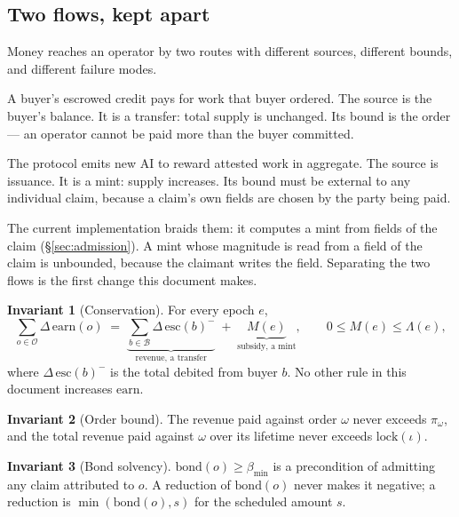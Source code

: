 \documentclass[11pt,a4paper]{article}
\theoremstyle{definition}
\newtheorem{invariant}{Invariant}[section]
\theoremstyle{remark}
\newcommand{\Ord}{\omega}
\newcommand{\Ops}{\mathcal{O}}
\newcommand{\Buyers}{\mathcal{B}}
\begin{document}
\subsection{Two flows, kept apart}

Money reaches an operator by two routes with different sources, different
bounds, and different failure modes.

\begin{description}[leftmargin=1.6em,style=nextline]
\item[Revenue.] A buyer's escrowed credit pays for work that buyer ordered. The
source is the buyer's balance. It is a transfer: total supply is unchanged.
Its bound is the order --- an operator cannot be paid more than the buyer
committed.
\item[Subsidy.] The protocol emits new AI to reward attested work in aggregate.
The source is issuance. It is a mint: supply increases. Its bound must be
external to any individual claim, because a claim's own fields are chosen by
the party being paid.
\end{description}

The current implementation braids them: it computes a mint from fields of the
claim (\S\ref{sec:admission}). A mint whose magnitude is read from a field of
the claim is unbounded, because the claimant writes the field. Separating the
two flows is the first change this document makes.

\begin{invariant}[Conservation]
\label{inv:conservation}
For every epoch $e$,
\[
\sum_{o \in \Ops} \Delta\,\mathrm{earn}(o)
\;=\;
\underbrace{\sum_{b \in \Buyers} \Delta\,\mathrm{esc}(b)^{-}}_{\text{revenue, a transfer}}
\;+\;
\underbrace{M(e)}_{\text{subsidy, a mint}},
\qquad
0 \le M(e) \le \Lambda(e),
\]
where $\Delta\,\mathrm{esc}(b)^{-}$ is the total debited from buyer $b$. No
other rule in this document increases $\mathrm{earn}$.
\end{invariant}

\begin{invariant}[Order bound]
\label{inv:orderbound}
The revenue paid against order $\Ord$ never exceeds $\pi_\Ord$, and the total
revenue paid against $\Ord$ over its lifetime never exceeds $\mathrm{lock}(\iota)$.
\end{invariant}

\begin{invariant}[Bond solvency]
\label{inv:bond}
$\mathrm{bond}(o) \ge \beta_{\min}$ is a precondition of admitting any claim
attributed to $o$. A reduction of $\mathrm{bond}(o)$ never makes it negative;
a reduction is $\min(\mathrm{bond}(o), s)$ for the scheduled amount $s$.
\end{invariant}
\end{document}
